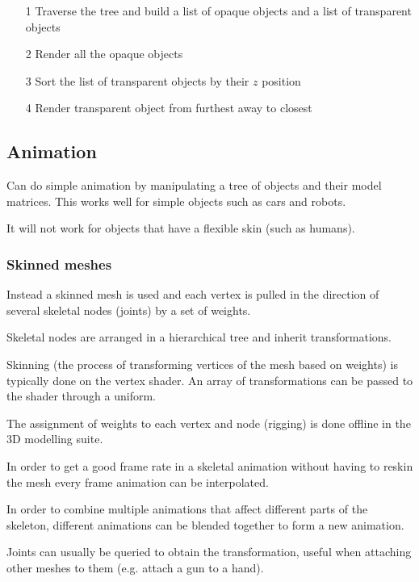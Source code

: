 \documentclass[a4paper]{article}
\begin{document}
\begin{enumerate}
  \item[1]
    Traverse the tree and build a list of opaque objects and a list of
    transparent objects

  \item[2]
    Render all the opaque objects

  \item[3]
    Sort the list of transparent objects by their $z$ position

  \item[4]
    Render transparent object from furthest away to closest

\end{enumerate}

\subsection{Animation}

Can do simple animation by manipulating a tree of objects and their model
matrices. This works well for simple objects such as cars and robots.

It will not work for objects that have a flexible skin (such as humans).

\subsubsection{Skinned meshes}

Instead a skinned mesh is used and each vertex is pulled in the direction of
several skeletal nodes (joints) by a set of weights.

Skeletal nodes are arranged in a hierarchical tree and inherit transformations.

Skinning (the process of transforming vertices of the mesh based on weights) is
typically done on the vertex shader. An array of transformations can be passed
to the shader through a uniform.

The assignment of weights to each vertex and node (rigging) is done offline in
the 3D modelling suite.

In order to get a good frame rate in a skeletal animation without having to
reskin the mesh every frame animation can be interpolated.

In order to combine multiple animations that affect different parts of the
skeleton, different animations can be blended together to form a new animation.

Joints can usually be queried to obtain the transformation, useful when
attaching other meshes to them (e.g. attach a gun to a hand).
\end{document}
